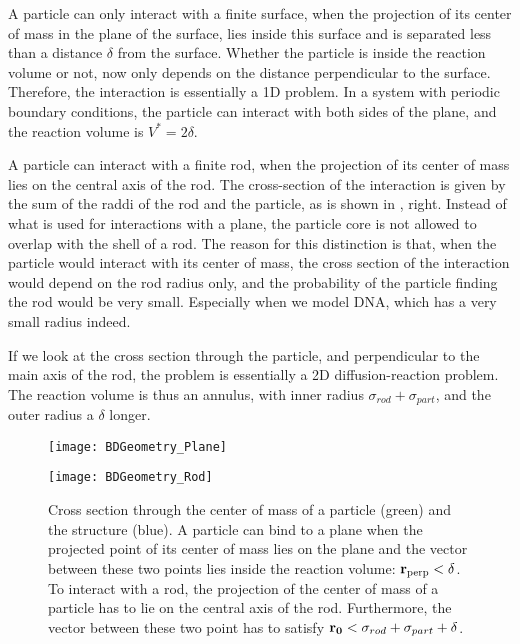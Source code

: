 A particle can only interact with a finite surface, when the projection of its center of mass in the plane of the surface, lies inside this surface and is separated less than a distance $\delta$ from the surface. Whether the particle is inside the reaction volume or not, now only depends on the distance perpendicular to the surface. Therefore, the interaction is essentially a 1D problem. In a system with periodic boundary conditions, the particle can interact with both sides of the plane, and the reaction volume is $V^*=2 \delta$.

A particle can interact with a finite rod, when the projection of its center of mass lies on the central axis of the rod. The cross-section of the interaction is given by the sum of the raddi of the rod and the particle, as is shown in , right. Instead of what is used for interactions with a plane, the particle core is not allowed to overlap with the shell of a rod. The reason for this distinction is that, when the particle would interact with its center of mass, the cross section of the interaction would depend on the rod radius only, and the probability of the particle finding the rod would be very small. Especially when we model DNA, which has a very small radius indeed.

If we look at the cross section through the particle, and perpendicular to the main axis of the rod, the problem is essentially a 2D diffusion-reaction problem. The reaction volume is thus an annulus, with inner radius $\sigma_{rod} + \sigma_{part}$, and the outer radius a $\delta$ longer.

\begin{figure}[ht]
\begin{minipage}[ht]{.5\linewidth}
\centering
\texttt{[image: BDGeometry\_Plane]}
\end{minipage}
\begin{minipage}[ht]{.5\linewidth}
\centering
\texttt{[image: BDGeometry\_Rod]}
\end{minipage}
\caption{ Cross section through the center of mass of a particle (green) and the structure (blue). A particle can bind to a plane when the projected point of its center of mass lies on the plane and the vector between these two points lies inside the reaction volume: ${\bf r}_{\rm perp}<\delta$. To interact with a rod, the projection of the center of mass of a particle has to lie on the central axis of the rod. Furthermore, the vector between these two point has to satisfy ${\bf r_0} < \sigma_{rod} + \sigma_{part} + \delta$.}
\end{figure}


